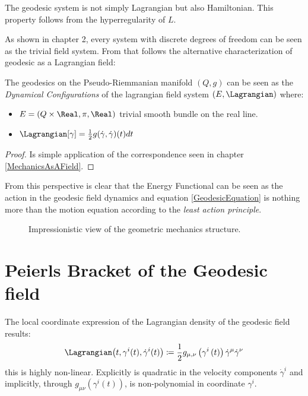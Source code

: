 \documentclass[Main]{subfiles}
\begin{document}
	\begin{observation}
		The geodesic system is not simply Lagrangian but also Hamiltonian.
		This property follows from the hyperregularity\cite{Abraham1978} of $L$.
	\end{observation}


	As shown in chapter 2, every system with discrete degrees of freedom can be seen as the trivial field system.
	From that follows the alternative characterization of geodesic as a Lagrangian field:
	\begin{corollary}
		The geodesics on the Pseudo-Riemmanian manifold $(Q,g)$ can be seen as the \emph{Dynamical Configurations} of the lagrangian field system $(E,\Lagrangian)$ where:
		\begin{itemize}
			\item $E=(Q\times\Real, \pi, \Real)$ trivial smooth bundle on the real line.
			\item $\Lagrangian[\gamma] = \frac{1}{2} g(\dot{\gamma},\dot{\gamma})(t) dt$
		\end{itemize}
	\end{corollary}
	\begin{proof}
		Is simple application of the correspondence seen in chapter \ref{MechanicsAsAField}.
	\end{proof}
	
	From this perspective is clear that the Energy Functional can be seen as the action in the geodesic field dynamics and equation \ref{GeodesicEquation} is nothing more than the motion equation according to the \emph{least action principle}.

		\begin{figure}[h!]
				  \centering
   	  \caption{Impressionistic view of the geometric mechanics structure.}
		\end{figure}		


\section{Peierls Bracket of the Geodesic field}
	The local coordinate expression of the Lagrangian density of the geodesic field results:
	\begin{equation}
		\Lagrangian\big(t,\gamma^i(t), \dot{\gamma}^i(t) \big)\coloneqq \frac{1}{2}g_{\mu,\nu}\left(\gamma^i\left(t\right)\right)\dot{\gamma}^\mu \dot{\gamma}^\nu
	\end{equation}		
	this is highly non-linear. 
	Explicitly is quadratic in the velocity components $\dot{\gamma}^i$ and implicitly, through $g_{\mu\nu}(\gamma^i(t))$, is non-polynomial in coordinate $\gamma^i$.
	
\end{document}
